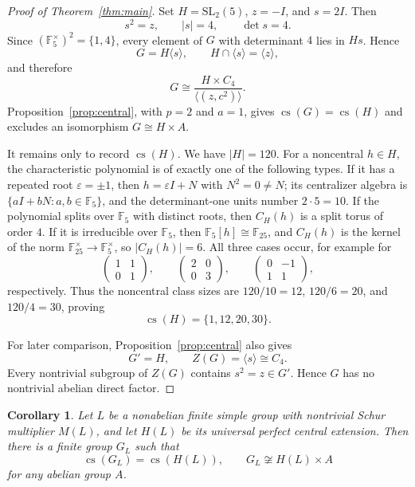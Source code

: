 \documentclass[11pt]{amsart}
\newtheorem{corollary}[theorem]{Corollary}
\theoremstyle{remark}
\newcommand{\cs}{\operatorname{cs}}
\newcommand{\F}{\mathbb F}
\begin{document}
\begin{proof}[Proof of Theorem~\ref{thm:main}]
Set \(H=\mathrm{SL}_2(5)\), \(z=-I\), and \(s=2I\).  Then
\[
s^2=z,\qquad |s|=4,\qquad \det s=4.
\]
Since \((\F_5^\times)^2=\{1,4\}\), every element of \(G\) with determinant
\(4\) lies in \(Hs\).  Hence
\[
G=H\langle s\rangle,
\qquad H\cap\langle s\rangle=\langle z\rangle,
\]
and therefore
\[
G\cong
\frac{H\times C_4}{\langle(z,c^2)\rangle}.
\]
Proposition~\ref{prop:central}, with \(p=2\) and \(a=1\), gives
\(\cs(G)=\cs(H)\) and excludes an isomorphism \(G\cong H\times A\).

It remains only to record \(\cs(H)\).  We have \(|H|=120\).  For a
noncentral \(h\in H\), the characteristic polynomial is of exactly one of
the following types.  If it has a repeated root \(\varepsilon=\pm1\), then
\(h=\varepsilon I+N\) with \(N^2=0\ne N\); its centralizer algebra is
\(\{aI+bN:a,b\in\F_5\}\), and the determinant-one units number
\(2\cdot5=10\).  If the polynomial splits over \(\F_5\) with distinct
roots, then \(C_H(h)\) is a split torus of order \(4\).  If it is
irreducible over \(\F_5\), then \(\F_5[h]\cong\F_{25}\), and
\(C_H(h)\) is the kernel of the norm
\(\F_{25}^\times\to\F_5^\times\), so \(|C_H(h)|=6\).  All three cases
occur, for example for
\[
\begin{pmatrix}1&1\\0&1\end{pmatrix},\qquad
\begin{pmatrix}2&0\\0&3\end{pmatrix},\qquad
\begin{pmatrix}0&-1\\1&1\end{pmatrix},
\]
respectively.  Thus the noncentral class sizes are
\(120/10=12\), \(120/6=20\), and \(120/4=30\), proving
\[
\cs(H)=\{1,12,20,30\}.
\]

For later comparison, Proposition~\ref{prop:central} also gives
\[
G'=H,\qquad Z(G)=\langle s\rangle\cong C_4.
\]
Every nontrivial subgroup of \(Z(G)\) contains
\(s^2=z\in G'\).  Hence \(G\) has no nontrivial abelian direct factor.
\end{proof}

\begin{corollary}\label{cor:general}
Let \(L\) be a nonabelian finite simple group with nontrivial Schur
multiplier \(M(L)\), and let \(H(L)\) be its universal perfect central
extension.  Then there is a finite group \(G_L\) such that
\[
\cs(G_L)=\cs(H(L)),
\qquad
G_L\not\cong H(L)\times A
\]
for any abelian group \(A\).
\end{corollary}
\end{document}
